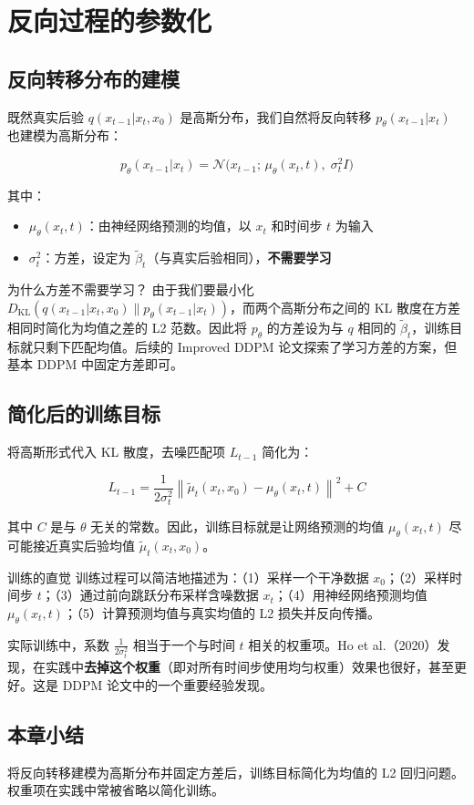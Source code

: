 \section{反向过程的参数化}

\subsection{反向转移分布的建模}

既然真实后验 $q(x_{t-1}|x_t, x_0)$ 是高斯分布，我们自然将反向转移 $p_\theta(x_{t-1}|x_t)$ 也建模为高斯分布：

$$p_\theta(x_{t-1}|x_t) = \mathcal{N}\big(x_{t-1};\, \mu_\theta(x_t, t),\; \sigma_t^2 I\big)$$

其中：
\begin{itemize}
    \item $\mu_\theta(x_t, t)$：由神经网络预测的均值，以 $x_t$ 和时间步 $t$ 为输入
    \item $\sigma_t^2$：方差，设定为 $\tilde{\beta}_t$（与真实后验相同），\textbf{不需要学习}
\end{itemize}

\begin{knowledgebox}{为什么方差不需要学习？}
由于我们要最小化 $D_{\text{KL}}(q(x_{t-1}|x_t,x_0) \| p_\theta(x_{t-1}|x_t))$，而两个高斯分布之间的 KL 散度在方差相同时简化为均值之差的 L2 范数。因此将 $p_\theta$ 的方差设为与 $q$ 相同的 $\tilde{\beta}_t$，训练目标就只剩下匹配均值。后续的 Improved DDPM 论文探索了学习方差的方案，但基本 DDPM 中固定方差即可。
\end{knowledgebox}

\subsection{简化后的训练目标}

将高斯形式代入 KL 散度，去噪匹配项 $L_{t-1}$ 简化为：

$$L_{t-1} = \frac{1}{2\sigma_t^2} \left\| \tilde{\mu}_t(x_t, x_0) - \mu_\theta(x_t, t) \right\|^2 + C$$

其中 $C$ 是与 $\theta$ 无关的常数。因此，训练目标就是让网络预测的均值 $\mu_\theta(x_t, t)$ 尽可能接近真实后验均值 $\tilde{\mu}_t(x_t, x_0)$。

\begin{importantbox}{训练的直觉}
训练过程可以简洁地描述为：（1）采样一个干净数据 $x_0$；（2）采样时间步 $t$；（3）通过前向跳跃分布采样含噪数据 $x_t$；（4）用神经网络预测均值 $\mu_\theta(x_t, t)$；（5）计算预测均值与真实均值的 L2 损失并反向传播。
\end{importantbox}

实际训练中，系数 $\frac{1}{2\sigma_t^2}$ 相当于一个与时间 $t$ 相关的权重项。Ho et al.（2020）发现，在实践中\textbf{去掉这个权重}（即对所有时间步使用均匀权重）效果也很好，甚至更好。这是 DDPM 论文中的一个重要经验发现。

\subsection{本章小结}

将反向转移建模为高斯分布并固定方差后，训练目标简化为均值的 L2 回归问题。权重项在实践中常被省略以简化训练。



